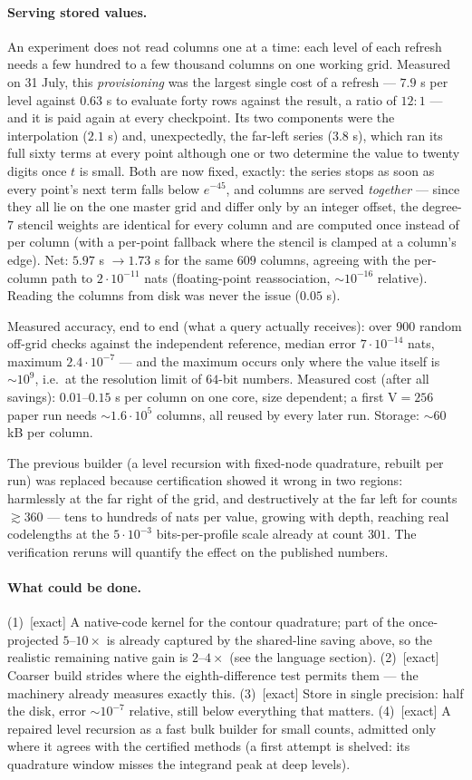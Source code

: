\documentclass[11pt]{article}
\newcommand{\field}[1]{\paragraph{#1.}}
\begin{document}
\field{Serving stored values}
An experiment does not read columns one at a time: each level of each
refresh needs a few hundred to a few thousand columns on one working
grid.  Measured on 31 July, this \emph{provisioning} was the largest
single cost of a refresh --- $7.9$ s per level against $0.63$ s to
evaluate forty rows against the result, a ratio of $12{:}1$ --- and it
is paid again at every checkpoint.  Its two components were the
interpolation ($2.1$ s) and, unexpectedly, the far-left series
($3.8$ s), which ran its full sixty terms at every point although one
or two determine the value to twenty digits once $t$ is small.  Both
are now fixed, exactly: the series stops as soon as every point's next
term falls below $e^{-45}$, and columns are served \emph{together} ---
since they all lie on the one master grid and differ only by an
integer offset, the degree-$7$ stencil weights are identical for every
column and are computed once instead of per column (with a per-point
fallback where the stencil is clamped at a column's edge).  Net:
$5.97$ s $\to 1.73$ s for the same $609$ columns, agreeing with the
per-column path to $2\cdot 10^{-11}$ nats (floating-point
reassociation, $\sim\!10^{-16}$ relative).  Reading the columns from
disk was never the issue ($0.05$ s).

Measured accuracy, end to end (what a query actually receives): over
$900$ random off-grid checks against the independent reference,
median error $7\cdot 10^{-14}$ nats, maximum $2.4\cdot 10^{-7}$ ---
and the maximum occurs only where the value itself is $\sim 10^9$,
i.e.\ at the resolution limit of $64$-bit numbers.  Measured cost
(after all savings): $0.01$--$0.15$ s per column on one core, size
dependent; a first V$=256$ paper run needs $\sim 1.6\cdot 10^5$
columns, all reused by every later run.  Storage: $\sim 60$ kB per
column.

The previous builder (a level recursion with fixed-node quadrature,
rebuilt per run) was replaced because certification showed it wrong
in two regions: harmlessly at the far right of the grid, and
destructively at the far left for counts $\gtrsim 360$ --- tens to
hundreds of nats per value, growing with depth, reaching real
codelengths at the $5\cdot 10^{-3}$ bits-per-profile scale already
at count $301$.  The verification reruns will quantify the effect on
the published numbers.

\field{What could be done}
(1)~[exact] A native-code kernel for the contour quadrature; part
of the once-projected $5$--$10\times$ is already captured by the
shared-line saving above, so the realistic remaining native gain is
$2$--$4\times$ (see the language section).
(2)~[exact] Coarser build strides where the eighth-difference test
permits them --- the machinery already measures exactly this.
(3)~[exact] Store in single precision: half the disk, error
$\sim 10^{-7}$ relative, still below everything that matters.
(4)~[exact] A repaired level recursion as a fast bulk builder for
small counts, admitted only where it agrees with the certified
methods (a first attempt is shelved: its quadrature window misses
the integrand peak at deep levels).
\end{document}
